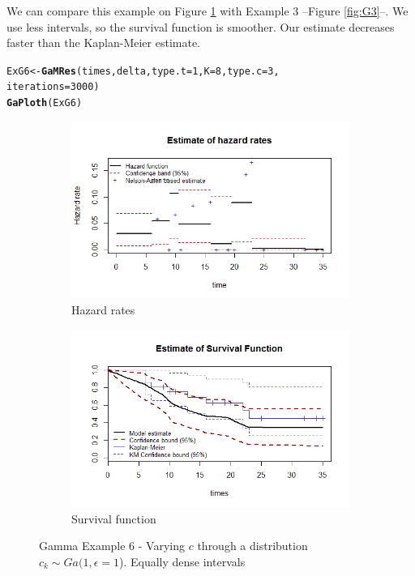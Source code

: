 \documentclass[letterpaper]{article}\usepackage[]{graphicx}\usepackage[]{xcolor}
\makeatletter
\newcommand{\hlnum}[1]{\textcolor[rgb]{0.686,0.059,0.569}{#1}}%
\newcommand{\hlstd}[1]{\textcolor[rgb]{0.345,0.345,0.345}{#1}}%
\newcommand{\hlkwb}[1]{\textcolor[rgb]{0.69,0.353,0.396}{#1}}%
\newcommand{\hlkwc}[1]{\textcolor[rgb]{0.333,0.667,0.333}{#1}}%
\newcommand{\hlkwd}[1]{\textcolor[rgb]{0.737,0.353,0.396}{\textbf{#1}}}%
\newenvironment{kframe}{%
 \def\at@end@of@kframe{}%
 \ifinner\ifhmode%
  \def\at@end@of@kframe{\end{minipage}}%
  \begin{minipage}{\columnwidth}%
 \fi\fi%
 \def\FrameCommand##1{\hskip\@totalleftmargin \hskip-\fboxsep
 \colorbox{shadecolor}{##1}\hskip-\fboxsep
     \hskip-\linewidth \hskip-\@totalleftmargin \hskip\columnwidth}%
 \MakeFramed {\advance\hsize-\width
   \@totalleftmargin\z@ \linewidth\hsize
   \@setminipage}}%
 {\par\unskip\endMakeFramed%
 \at@end@of@kframe}
\newenvironment{knitrout}{}{} %
\makeatother
\begin{document}
We can compare this example on Figure \ref{fig:G6} with Example 3 --Figure \ref{fig:G3}--. We use less intervals, so the survival function is smoother. Our estimate decreases faster than the Kaplan-Meier estimate. 

\begin{knitrout}
\color{fgcolor}\begin{kframe}
\begin{alltt}
\hlstd{ExG6} \hlkwb{<-} \hlkwd{GaMRes}\hlstd{(times, delta,} \hlkwc{type.t} \hlstd{=} \hlnum{1}\hlstd{,} \hlkwc{K} \hlstd{=} \hlnum{8}\hlstd{,} \hlkwc{type.c} \hlstd{=} \hlnum{3}\hlstd{,}
               \hlkwc{iterations}\hlstd{=}\hlnum{3000}\hlstd{)}
\hlkwd{GaPloth}\hlstd{(ExG6)}
\end{alltt}
\end{kframe}
\end{knitrout}

\begin{figure}
  \centering
  \begin{subfigure}[a]{\textwidth}\centering
    \includegraphics[width=\textwidth]{G61.png}
    \caption{Hazard rates}
  \end{subfigure}
  \begin{subfigure}[b]{\textwidth}\centering
    \includegraphics[width=\textwidth]{G62.png}
    \caption{Survival function}
  \end{subfigure}
  \caption{Gamma Example 6 - Varying $c$ through a distribution $c_k\sim Ga(1,\epsilon = 1$). Equally dense intervals}
  \label{fig:G6}
\end{figure}
\end{document}

